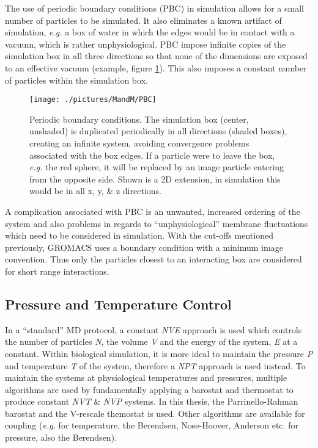 The use of periodic boundary conditions (PBC) in simulation allows for a small number of particles to be simulated. It also eliminates a known artifact of simulation, \textit{e.g.} a box of water in which the edges would be in contact with a vacuum, which is rather unphysiological. PBC impose infinite copies of the simulation box in all three directions so that none of the dimensions are exposed to an effective vacuum (example, figure \ref{fig:PBC}). This also imposes a constant number of particles within the simulation box. 

\begin{figure}[H]
\begin{center}
\texttt{[image: ./pictures/MandM/PBC]}
\caption[Periodic boundary conditions] {Periodic boundary conditions. The simulation box (center, unshaded) is duplicated periodically in all directions (shaded boxes), creating an infinite system, avoiding convergence problems associated with the box edges. If a particle were to leave the box, \textit{e.g.} the red sphere, it will be replaced by an image particle entering from the opposite side. Shown is a 2D extension, in simulation this would be in all x, y, \& z directions. }
\label{fig:PBC}
\end{center}
\end{figure}

A complication associated with PBC is an unwanted, increased ordering of the system \cite{Tieleman2010} and also problems in regards to ``unphysiological''  membrane fluctuations \cite{Marrink2001} which need to be considered in simulation. With the cut-offs mentioned previously, GROMACS uses a boundary condition with a minimum image convention. Thus only the particles closest to an interacting box are considered for short range interactions. 

\subsection{Pressure and Temperature Control}

In a ``standard'' MD protocol, a constant \textit{NVE} approach is used which controls the number of particles \textit{N}, the volume \textit{V} and the energy of the system, \textit{E} at a constant. Within biological simulation, it is more ideal to maintain the pressure \textit{P} and temperature \textit{T} of the system, therefore a \textit{NPT} approach is used instead. To maintain the systems at physiological temperatures and pressures, multiple algorithms are used by fundamentally applying a barostat and thermostat  to produce constant \textit{NVT} \& \textit{NVP} systems. In this thesis, the Parrinello-Rahman barostat \cite{Parrinello1981} and the V-rescale themostat \cite{Bussi2007d} is used. Other algorithms are available for coupling (\textit{e.g.} for temperature, the Berendsen, Nose-Hoover, Anderson etc. for pressure, also the Berendsen).  

